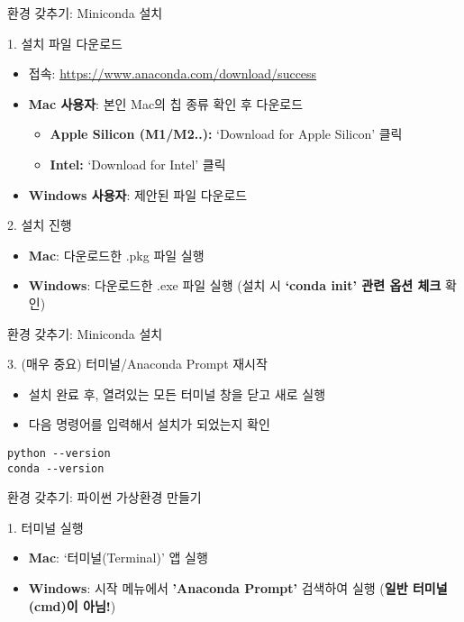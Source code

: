 \documentclass[11pt, aspectratio=169]{beamer}
\begin{document}
\begin{frame}[t]{환경 갖추기: Miniconda 설치}
  \begin{block}{1. 설치 파일 다운로드}
    \begin{itemize}
        \item 접속: \url{https://www.anaconda.com/download/success}
        \item \textbf{Mac 사용자}: 본인 Mac의 칩 종류 확인 후 다운로드
        \begin{itemize}
            \item \textbf{Apple Silicon (M1/M2..):} `Download for Apple Silicon' 클릭
            \item \textbf{Intel:} `Download for Intel' 클릭
        \end{itemize}
        \item \textbf{Windows 사용자}: 제안된 파일 다운로드
    \end{itemize}
  \end{block}  
  \begin{block}{2. 설치 진행}
    \begin{itemize}
        \item \textbf{Mac}: 다운로드한 .pkg 파일 실행
        \item \textbf{Windows}: 다운로드한 .exe 파일 실행 (설치 시 \textbf{`conda init' 관련 옵션 체크} 확인)
    \end{itemize}    
  \end{block}
\end{frame}

\begin{frame}[t, fragile]{환경 갖추기: Miniconda 설치}
  \begin{block}{3. (매우 중요) 터미널/Anaconda Prompt 재시작}
    \begin{itemize}
        \item 설치 완료 후, 열려있는 모든 터미널 창을 닫고 새로 실행
        \item 다음 명령어를 입력해서 설치가 되었는지 확인
    \end{itemize}   
  \end{block}
  \begin{verbatim}
python --version
conda --version
  \end{verbatim}
\end{frame}

\begin{frame}[t,fragile]{환경 갖추기: 파이썬 가상환경 만들기}
  \begin{block}{1. 터미널 실행}
    \begin{itemize}
        \item \textbf{Mac}: `터미널(Terminal)' 앱 실행
        \item \textbf{Windows}: 시작 메뉴에서 \textbf{'Anaconda Prompt'} 검색하여 실행 (\textbf{일반 터미널(cmd)이 아님!})
    \end{itemize}    
  \end{block}
\end{frame}
\end{document}
